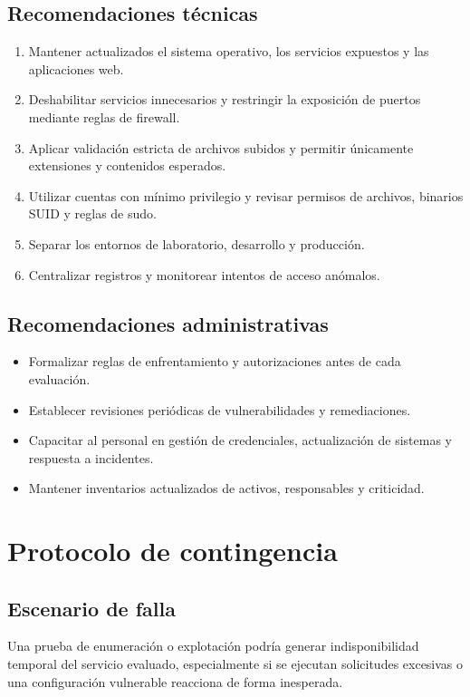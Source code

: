 \documentclass[11pt,a4paper]{article}
\begin{document}
\subsection{Recomendaciones técnicas}
\begin{enumerate}[leftmargin=*]
  \item Mantener actualizados el sistema operativo, los servicios expuestos y las aplicaciones web.
  \item Deshabilitar servicios innecesarios y restringir la exposición de puertos mediante reglas de firewall.
  \item Aplicar validación estricta de archivos subidos y permitir únicamente extensiones y contenidos esperados.
  \item Utilizar cuentas con mínimo privilegio y revisar permisos de archivos, binarios SUID y reglas de sudo.
  \item Separar los entornos de laboratorio, desarrollo y producción.
  \item Centralizar registros y monitorear intentos de acceso anómalos.
\end{enumerate}

\subsection{Recomendaciones administrativas}
\begin{itemize}[leftmargin=*]
  \item Formalizar reglas de enfrentamiento y autorizaciones antes de cada evaluación.
  \item Establecer revisiones periódicas de vulnerabilidades y remediaciones.
  \item Capacitar al personal en gestión de credenciales, actualización de sistemas y respuesta a incidentes.
  \item Mantener inventarios actualizados de activos, responsables y criticidad.
\end{itemize}

\section{Protocolo de contingencia}

\subsection{Escenario de falla}
Una prueba de enumeración o explotación podría generar indisponibilidad temporal del servicio evaluado, especialmente si se ejecutan solicitudes excesivas o una configuración vulnerable reacciona de forma inesperada.
\end{document}

